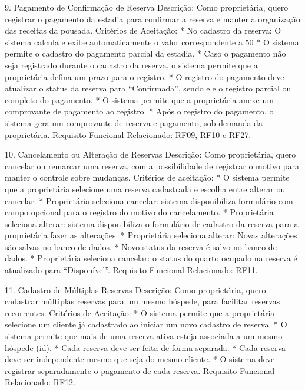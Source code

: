 9. Pagamento de Confirmação de Reserva
Descrição: Como proprietária, quero registrar o pagamento  da estadia para confirmar a reserva e manter a organização das receitas da pousada.
Critérios de Aceitação:
* No cadastro da reserva: O sistema calcula e exibe automaticamente o valor correspondente a 50%
* O sistema permite o cadastro do pagamento parcial da estadia.
* Caso o pagamento não seja registrado durante o cadastro da reserva, o sistema permite que a proprietária defina um prazo para o registro.
* O registro do pagamento deve atualizar o status da reserva para “Confirmada”, sendo ele o registro parcial ou completo do pagamento.
* O sistema permite que a proprietária anexe um comprovante de pagamento ao registro.
* Após o registro do pagamento, o sistema gera um comprovante de reserva e pagamento, sob demanda da proprietária.
Requisito Funcional Relacionado: RF09, RF10 e RF27.








10. Cancelamento ou Alteração de Reservas
Descrição: Como proprietária, quero cancelar ou remarcar uma reserva, com a possibilidade de registrar o motivo  para manter o controle sobre mudanças.
Critérios de aceitação:
* O sistema permite que a proprietária selecione uma reserva cadastrada e escolha entre alterar ou cancelar.
* Proprietária seleciona cancelar: sistema disponibiliza formulário com campo opcional para o registro do motivo do cancelamento.
* Proprietária seleciona alterar: sistema disponibiliza o formulário de cadastro da reserva para a proprietária fazer as alterações.
* Proprietária seleciona alterar: Novas alterações são salvas no banco de dados.
* Novo status da reserva é salvo no banco de dados.
* Proprietária seleciona cancelar: o status do quarto ocupado na reserva é atualizado para “Disponível”.
Requisito Funcional Relacionado: RF11.


11. Cadastro de Múltiplas Reservas
Descrição: Como proprietária, quero cadastrar múltiplas reservas para um mesmo hóspede, para facilitar reservas recorrentes.
Critérios de Aceitação:
* O sistema permite que a proprietária selecione um cliente já cadastrado ao iniciar um novo cadastro de reserva.
* O sistema permite que mais de uma reserva ativa esteja associada a um mesmo hóspede (id).
* Cada reserva deve ser feita de forma separada.
* Cada reserva deve ser independente mesmo que seja do mesmo cliente. 
* O sistema deve registrar separadamente o pagamento de cada reserva.
Requisito Funcional Relacionado: RF12.


